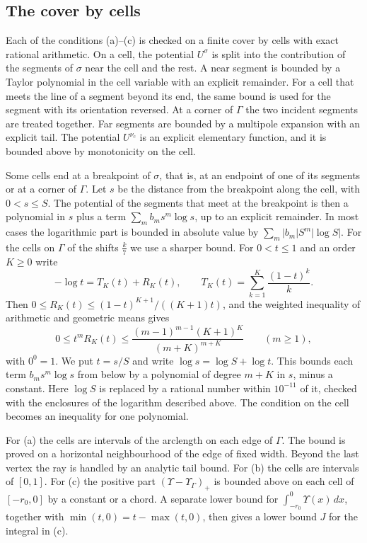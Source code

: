 \documentclass[11pt]{amsart}
\theoremstyle{definition}
\theoremstyle{remark}
\numberwithin{equation}{section}
\begin{document}
\subsection{The cover by cells}\label{ssec:slope-cert}
Each of the conditions (a)--(c) is checked on a finite cover by cells with exact rational arithmetic. On a cell, the
potential $U^\sigma$ is split into the contribution of the segments of $\sigma$ near the cell and the rest. A near segment
is bounded by a Taylor polynomial in the cell variable with an explicit remainder. For a cell that meets the line of a
segment beyond its end, the same bound is used for the segment with its orientation reversed. At a corner of $\Gamma$ the
two incident segments are treated together. Far segments are bounded by a multipole expansion with an explicit tail. The
potential $U^{\nu_c}$ is an explicit elementary function, and it is bounded above by monotonicity on the cell.

Some cells end at a breakpoint of $\sigma$, that is, at an endpoint of one of its segments or at a corner of $\Gamma$.
Let $s$ be the distance from the breakpoint along the cell, with $0<s\le S$. The potential of the segments that meet at
the breakpoint is then a polynomial in $s$ plus a term $\sum_mb_ms^m\log s$, up to an explicit remainder. In most cases
the logarithmic part is bounded in absolute value by $\sum_m|b_m|S^m|\log S|$. For the cells on $\Gamma$ of the shifts
$\frac k7$ we use a sharper bound. For $0<t\le1$ and an order $K\ge0$ write
\[
 -\log t=T_K(t)+R_K(t),\qquad T_K(t)=\sum_{k=1}^K\frac{(1-t)^k}k .
\]
Then $0\le R_K(t)\le(1-t)^{K+1}/((K+1)t)$, and the weighted inequality of arithmetic and geometric means gives
\[
 0\le t^mR_K(t)\le\frac{(m-1)^{m-1}(K+1)^K}{(m+K)^{m+K}}\qquad(m\ge1),
\]
with $0^0=1$. We put $t=s/S$ and write $\log s=\log S+\log t$. This bounds each term $b_ms^m\log s$ from below by a
polynomial of degree $m+K$ in $s$, minus a constant. Here $\log S$ is replaced by a rational number within $10^{-11}$ of
it, checked with the enclosures of the logarithm described above. The condition on the cell becomes an inequality for
one polynomial.

For (a) the cells are intervals of the arclength on each edge of $\Gamma$. The bound is proved on a horizontal
neighbourhood of the edge of fixed width. Beyond the last vertex the ray is handled by an analytic tail bound. For (b)
the cells are intervals of $[0,1]$. For (c) the positive part $(\Upsilon-\Upsilon_\Gamma)_+$ is bounded above on each
cell of $[-r_0,0]$ by a constant or a chord. A separate lower bound for $\int_{-r_0}^0\Upsilon(x)\,dx$, together with
$\min(t,0)=t-\max(t,0)$, then gives a lower bound $J$ for the integral in (c).
\end{document}
